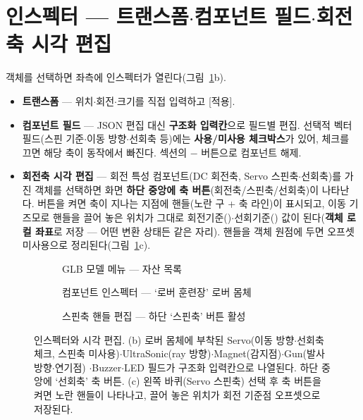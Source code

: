 \section{인스펙터 --- 트랜스폼$\cdot$컴포넌트 필드$\cdot$회전축 시각 편집}
\label{sec:simg-inspector}
객체를 선택하면 좌측에 인스펙터가 열린다(그림~\ref{fig:simg-insp}b).
\begin{itemize}
  \item \textbf{트랜스폼} --- 위치$\cdot$회전\textdegree$\cdot$크기를 직접 입력하고 [적용].
  \item \textbf{컴포넌트 필드} --- JSON 편집 대신 \textbf{구조화 입력칸}으로 필드별 편집.
  선택적 벡터 필드(스핀 기준$\cdot$이동 방향$\cdot$선회축 등)에는 \textbf{사용/미사용
  체크박스}가 있어, 체크를 끄면 해당 축이 동작에서 빠진다. 섹션의 $-$ 버튼으로 컴포넌트 해제.
  \item \textbf{회전축 시각 편집} --- 회전 특성 컴포넌트(DC 회전축, Servo 스핀축$\cdot$선회축)를
  가진 객체를 선택하면 화면 \textbf{하단 중앙에 축 버튼}(회전축/스핀축/선회축)이 나타난다.
  버튼을 켜면 축이 지나는 지점에 핸들(노란 구 + 축 라인)이 표시되고, 이동 기즈모로 핸들을
  끌어 놓은 위치가 그대로 회전기준()$\cdot$선회기준()
  값이 된다(\textbf{객체 로컬 좌표}로 저장 --- 어떤 변환 상태든 같은 자리). 핸들을 객체
  원점에 두면 오프셋 미사용으로 정리된다(그림~\ref{fig:simg-insp}c).
\end{itemize}

\begin{figure}[htbp]\centering
  \begin{subfigure}{0.49\linewidth}\centering
    \caption{GLB 모델 메뉴 ---  자산 목록}
  \end{subfigure}\hfill
  \begin{subfigure}{0.49\linewidth}\centering
    \caption{컴포넌트 인스펙터 --- `로버 훈련장' 로버 몸체}
  \end{subfigure}

  \medskip
  \begin{subfigure}{0.49\linewidth}\centering
    \caption{스핀축 핸들 편집 --- 하단 `스핀축' 버튼 활성}
  \end{subfigure}
  \caption{인스펙터와 시각 편집. (b) 로버 몸체에 부착된 Servo(이동 방향$\cdot$선회축 체크,
  스핀축 미사용)$\cdot$UltraSonic(ray 방향)$\cdot$Magnet(감지점)$\cdot$Gun(발사 방향$\cdot$연기점)
  $\cdot$Buzzer$\cdot$LED 필드가 구조화 입력칸으로 나열된다. 하단 중앙에 `선회축' 축 버튼.
  (c) 왼쪽 바퀴(Servo 스핀축) 선택 후 축 버튼을 켜면 노란 핸들이 나타나고, 끌어 놓은
  위치가 회전 기준점 오프셋으로 저장된다.}
  \label{fig:simg-insp}
\end{figure}

